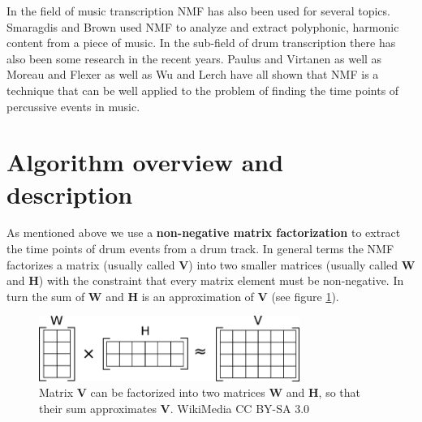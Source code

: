 \documentclass{article}
\begin{document}
In the field of music transcription NMF has also been used for several topics.
Smaragdis and Brown \cite{smaragdis2003} used NMF to analyze and extract polyphonic, harmonic content from a piece of music.
In the sub-field of drum transcription there has also been some research in the recent years.
Paulus and Virtanen \cite{paulus2005} as well as Moreau and Flexer \cite{moreau2007} as well as Wu and Lerch \cite{wu2015} have all shown that NMF is a technique that can be well applied to the problem of finding the time points of percussive events in music.







\section{Algorithm overview and description}
\label{sec:algo}

As mentioned above we use a \textbf{non-negative matrix factorization} to extract the time points of drum events from a drum track.
In general terms the NMF factorizes a matrix (usually called $\mathbf{V}$) into two smaller matrices (usually called $\mathbf{W}$ and $\mathbf{H}$) with the constraint that every matrix element must be non-negative.
In turn the sum of $\mathbf{W}$ and $\mathbf{H}$ is an approximation of $\mathbf{V}$ (see figure \ref{fig:NMF}).

\begin{figure}[htb]

\begin{minipage}[b]{1.0\linewidth}
  \centering
  \centerline{\includegraphics[width=8.5cm]{figures/NMF}}
  \medskip
\end{minipage}

\caption{Matrix $\mathbf{V}$ can be factorized into two matrices $\mathbf{W}$ and $\mathbf{H}$, so that their sum approximates $\mathbf{V}$. \scriptsize{\textsf{\textcopyright} WikiMedia CC BY-SA 3.0}}
\label{fig:NMF}

\end{figure}
\end{document}
